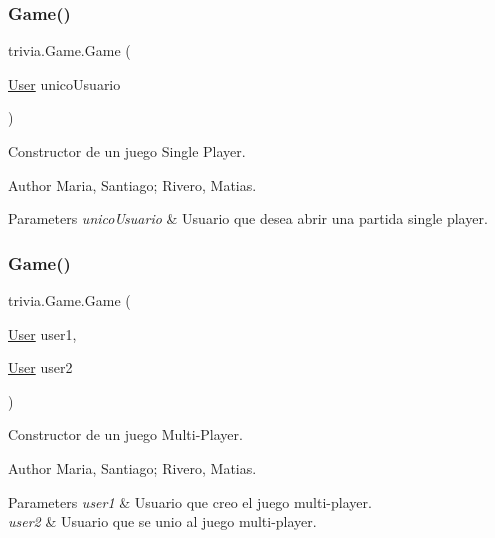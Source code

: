 \subsubsection{\texorpdfstring{Game()}{Game()}\hspace{0.1cm}{\footnotesize\ttfamily [2/3]}}
{\footnotesize\ttfamily trivia.\+Game.\+Game (\begin{DoxyParamCaption}\item[{\mbox{\hyperlink{classtrivia_1_1User}{User}}}]{unico\+Usuario }\end{DoxyParamCaption})\hspace{0.3cm}{\ttfamily [inline]}}

Constructor de un juego Single Player. \begin{DoxyAuthor}{Author}
Maria, Santiago; Rivero, Matias. 
\end{DoxyAuthor}

\begin{DoxyParams}{Parameters}
{\em unico\+Usuario} & Usuario que desea abrir una partida single player. \\
\hline
\end{DoxyParams}
\mbox{\label{classtrivia_1_1Game_a03c33ebd51af0b2137101ac28e5b2536}} 
\subsubsection{\texorpdfstring{Game()}{Game()}\hspace{0.1cm}{\footnotesize\ttfamily [3/3]}}
{\footnotesize\ttfamily trivia.\+Game.\+Game (\begin{DoxyParamCaption}\item[{\mbox{\hyperlink{classtrivia_1_1User}{User}}}]{user1,  }\item[{\mbox{\hyperlink{classtrivia_1_1User}{User}}}]{user2 }\end{DoxyParamCaption})\hspace{0.3cm}{\ttfamily [inline]}}

Constructor de un juego Multi-\/\+Player. \begin{DoxyAuthor}{Author}
Maria, Santiago; Rivero, Matias. 
\end{DoxyAuthor}

\begin{DoxyParams}{Parameters}
{\em user1} & Usuario que creo el juego multi-\/player. \\
\hline
{\em user2} & Usuario que se unio al juego multi-\/player. \\
\hline
\end{DoxyParams}


